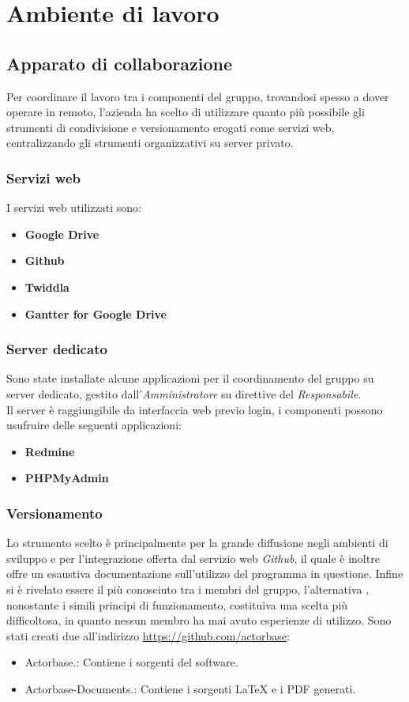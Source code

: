 \section{Ambiente di lavoro}
\subsection{Apparato di collaborazione}
Per coordinare il lavoro tra i componenti del gruppo, trovandosi spesso a dover
operare in remoto, l'azienda ha scelto di utilizzare quanto più possibile gli
strumenti di condivisione e versionamento erogati come servizi web,
centralizzando gli strumenti organizzativi su server privato.
\subsubsection{Servizi web}
I servizi web utilizzati sono:
\begin{itemize}
\item\textbf{Google Drive}
\item\textbf{Github}
\item\textbf{Twiddla}
\item\textbf{Gantter for Google Drive}
\end{itemize}
\subsubsection{Server dedicato}
Sono state installate alcune applicazioni per il coordinamento del gruppo su
server dedicato, gestito dall'\textit{Amministratore} su direttive del
\textit{Responsabile}.\\ Il server è raggiungibile da interfaccia web previo
login, i componenti possono usufruire delle seguenti applicazioni:
\begin{itemize}
\item\textbf{Redmine}
\item\textbf{PHPMyAdmin}
\end{itemize}
\subsubsection{Versionamento}
Lo strumento scelto è  principalmente per la grande diffusione negli
ambienti di sviluppo e per l'integrazione offerta dal servizio web
\textit{Github}, il quale è inoltre offre un esaustiva documentazione
sull'utilizzo del programma in questione. Infine  si è rivelato essere
il più conosciuto tra i membri del gruppo, l'alternativa , nonostante
i simili principi di funzionamento, costituiva una scelta più difficoltosa, in
quanto nessun membro ha mai avuto esperienze di utilizzo.
Sono stati creati due  all'indirizzo \url{https://github.com/actorbase}:
\begin{itemize}
\item Actorbase.: Contiene i sorgenti del software.
\item Actorbase-Documents.: Contiene i sorgenti \LaTeX\xspace e i PDF generati.
\end{itemize}
